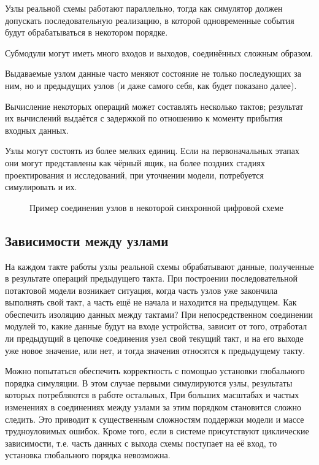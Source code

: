 \begin{itemize*}
    \item Узлы реальной схемы работают параллельно, тогда как симулятор должен допускать последовательную реализацию, в которой одновременные события будут обрабатываться в некотором порядке.
    \item Субмодули могут иметь много входов и выходов, соединённых сложным образом.
    \item Выдаваемые узлом данные часто меняют состояние не только последующих за ним, но и предыдущих узлов (и даже самого себя, как будет показано далее).
    \item Вычисление некоторых операций может составлять несколько тактов; результат их вычислений выдаётся с задержкой по отношению к моменту прибытия входных данных.
    \item Узлы могут состоять из более мелких единиц. Если на первоначальных этапах они могут представлены как чёрный ящик, на более поздних стадиях проектирования и исследований, при  уточнении модели, потребуется симулировать и их.
\end{itemize*}

\begin{figure}[htbp]
    \centering
    \caption[Пример соединения узлов]{Пример соединения узлов в некоторой синхронной цифровой схеме}
    \label{fig:features}
\end{figure}

\subsection{Зависимости между узлами}

На каждом такте работы узлы реальной схемы обрабатывают данные, полученные в результате операций предыдущего такта. При построении последовательной потактовой модели возникает ситуация, когда часть узлов уже закончила выполнять свой такт, а часть ещё не начала и находится на предыдущем. Как обеспечить изоляцию данных между тактами? При непосредственном соединении модулей то, какие данные будут на входе устройства, зависит от того, отработал ли предыдущий в цепочке соединения узел свой текущий такт, и на его выходе уже новое значение, или нет, и тогда значения относятся к предыдущему такту. 

Можно попытаться обеспечить корректность с помощью установки глобального порядка симуляции. В этом случае первыми симулируются узлы, результаты которых потребляются в работе остальных, При больших масштабах и частых изменениях в соединениях между узлами за этим порядком становится сложно следить. Это приводит к существенным сложностям поддержки модели и массе трудноуловимых ошибок. Кроме того, если в системе присутствуют циклические зависимости, т.е. часть данных с выхода схемы поступает на её вход, то установка глобального порядка невозможна.

